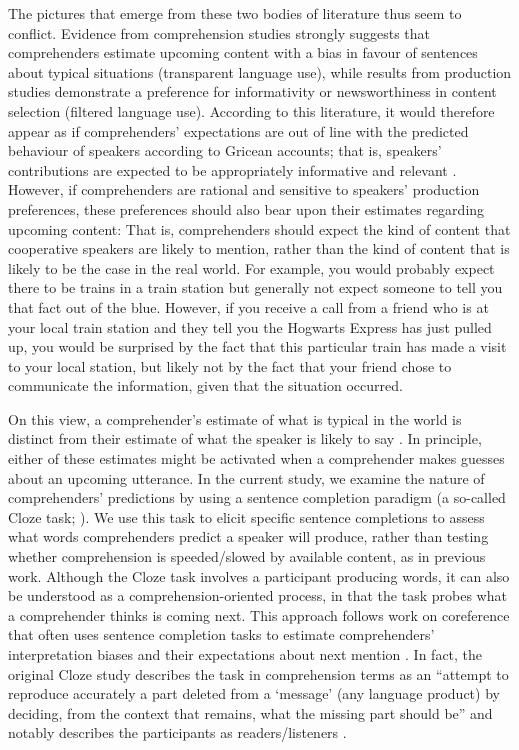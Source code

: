 \documentclass[output=paper,colorlinks,citecolor=brown]{langscibook}
\begin{document}
The pictures that emerge from these two bodies of literature thus seem to conflict. Evidence from comprehension studies strongly suggests that comprehenders estimate upcoming content with a bias in favour of sentences about typical situations (transparent language use), while results from production studies demonstrate a preference for informativity or newsworthiness in content selection (filtered language use). According to this literature, it would therefore appear as if comprehenders’ expectations are out of line with the predicted behaviour of speakers according to Gricean accounts; that is, speakers’ contributions are expected to be appropriately informative and relevant \citep{Grice1975}. However, if comprehenders are rational and sensitive to speakers’ production preferences, these preferences should also bear upon their estimates regarding upcoming content: That is, comprehenders should expect the kind of content that cooperative speakers are likely to mention, rather than the kind of content that is likely to be the case in the real world. For example, you would probably expect there to be trains in a train station but generally not expect someone to tell you that fact out of the blue. However, if you receive a call from a friend who is at your local train station and they tell you the Hogwarts Express has just pulled up, you would be surprised by the fact that this particular train has made a visit to your local station, but likely not by the fact that your friend chose to communicate the information, given that the situation occurred. 
 
On this view, a comprehender's estimate of what is typical in the world is distinct from their estimate of what the speaker is likely to say \citep{RohdeLucas2021}. In principle, either of these estimates might be activated when a comprehender makes guesses about an upcoming utterance. In the current study, we examine the nature of comprehenders’ predictions by using a sentence completion paradigm (a so-called Cloze task; \cite{Taylor1953}). We use this task to elicit specific sentence completions to assess what words comprehenders predict a speaker will produce, rather than testing whether comprehension is speeded/slowed by available content, as in previous work. Although the Cloze task involves a participant producing words, it can also be understood  as a comprehension-oriented process, in that the task probes what a comprehender thinks is coming next. This approach follows work on coreference that often uses sentence completion tasks to estimate comprehenders' interpretation biases and their expectations about next mention \citep[e.g.][]{StevensonKleinman1994}. In fact, the original Cloze study describes the task in comprehension terms as an ``attempt to reproduce accurately a part deleted from a `message' (any language product) by deciding, from the context that remains, what the missing part should be'' and notably describes the participants as readers/listeners \citep[][416]{Taylor1953}. 
\end{document}
